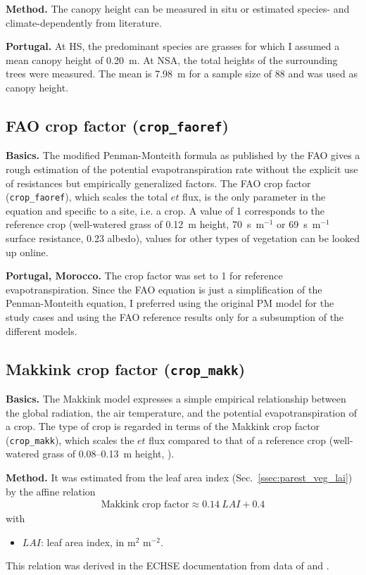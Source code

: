 \documentclass{scrreprt}
\newenvironment{denseitem}{
  \begin{itemize}
    \setlength{\itemsep}{0pt}
    \setlength{\parskip}{0pt}
    \setlength{\parsep}{0pt}
}{
  \end{itemize}
}
\begin{document}
\textbf{Method.}
The canopy height can be measured in situ or estimated species- and climate-dependently from literature.

\textbf{Portugal.}
At HS, the predominant species are grasses for which I assumed a mean canopy height of 0.20~m.
At NSA, the total heights of the surrounding trees were measured.
The mean is 7.98~m for a sample size of 88 and was used as canopy height.

\subsection{FAO crop factor (\texttt{crop\_faoref})} \label{ssec:parest_veg_cropfaoref}

\textbf{Basics.}
The modified Penman-Monteith formula as published by the FAO \citep{fao98} gives a rough estimation of the potential evapotranspiration rate without the explicit use of resistances but empirically generalized factors.
The FAO crop factor (\verb!crop_faoref!), which scales the total $et$ flux, is the only parameter in the equation and specific to a site, i.e. a crop.
A value of 1 corresponds to the reference crop (well-watered grass of 0.12~m height, 70~s~m$^{-1}$ \citep{fao98} or 69~s~m$^{-1}$ \citep{shuttleworth07} surface resistance, 0.23 albedo), values for other types of vegetation can be looked up online.

\textbf{Portugal, Morocco.}
The crop factor was set to 1 for reference evapotranspiration.
Since the FAO equation is just a simplification of the Penman-Monteith equation, I preferred using the original PM model for the study cases and using the FAO reference results only for a subsumption of the different models.

\subsection{Makkink crop factor (\texttt{crop\_makk})} \label{ssec:parest_veg_cropmakk}

\textbf{Basics.}
The Makkink model expresses a simple empirical relationship between the global radiation, the air temperature, and the potential evapotranspiration of a crop.
The type of crop is regarded in terms of the Makkink crop factor (\verb!crop_makk!), which scales the $et$ flux compared to that of a reference crop (well-watered grass of 0.08--0.13~m height, \citealt{feddes87}).

\textbf{Method.}
It was estimated from the leaf area index (Sec.~\ref{ssec:parest_veg_lai}) by the affine relation
\begin{align} \label{eq:cropmakk}
  \text{Makkink~crop~factor} \approx 0.14 ~ LAI + 0.4
\end{align}
%
with
\begin{denseitem}
  \item[] $LAI$: leaf area index, in m$^2$ m$^{-2}$.
\end{denseitem}
%
This relation was derived in the ECHSE documentation from data of \citet{feddes87} and \citet{ludwig06}.
\end{document}
